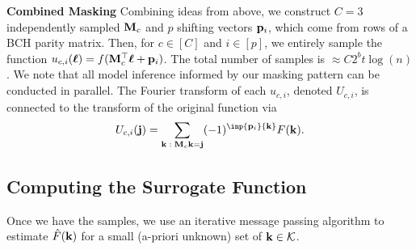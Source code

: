 \textbf{Combined Masking } Combining ideas from above, we construct $C = 3$ independently sampled $\mathbf M_c$ and $p$ shifting vectors $\mathbf p_i$, which come from rows of a BCH parity matrix.  Then, for $c \in [C]$ and $i \in [p]$, we entirely sample the function $u_{c,i}(\boldsymbol{\ell}) = f(\mathbf M_c^{\top} \boldsymbol{\ell} + \mathbf p_i)$. The total number of samples is $\approx C2^bt\log(n)$. We note that all model inference informed by our masking pattern can be conducted in parallel.
The Fourier transform of each $u_{c,i}$, denoted $U_{c,i}$, is connected to the transform of the original function via
\begin{equation} \label{eq:alais}
    U_{c,i}(\bj) = \sum_{\bk\; : \;\bM_c \bk = \bj} (-1)^{\inp{\bp_i}{\bk}} F(\bk).
\end{equation}


\subsection{Computing the Surrogate Function}
Once we have the samples, we use an iterative message passing algorithm to estimate $\hat{F}(\mathbf k)$ for a small (a-priori unknown) set of $\mathbf k \in \mathcal K$. 

\vspace{-7pt}
